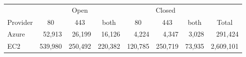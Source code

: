 \begin{tabular}{|l|r|r|r|r|r|r|r|} 
\hline
& \multicolumn{3}{|c|}{Open}&\multicolumn{3}{|c|}{Closed} & \\ 
Provider &\multicolumn{1}{|c|}{80}& \multicolumn{1}{|c|}{443} &\multicolumn{1}{|c|}{both} &\multicolumn{1}{|c|}{80}& \multicolumn{1}{|c|}{443}&\multicolumn{1}{|c|}{both} & \multicolumn{1}{|c|}{Total} \\ 
\hline
\hline
Azure & 52,913 & 26,199 & 16,126 & 4,224 & 4,347 & 3,028 & 291,424 \\ \hline
EC2 & 539,980 & 250,492 & 220,382 &120,785 & 250,719 & 73,935 & 2,609,101 \\ 
\hline 
\end{tabular}
